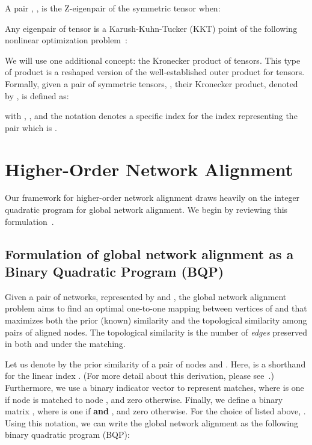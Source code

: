 \documentclass[10pt, journal, compsoc, final]{IEEEtran}
\begin{document}
A pair , , is the Z-eigenpair of
the symmetric tensor  when:

Any eigenpair  of tensor  is a Karush-Kuhn-Tucker (KKT)
point of the following nonlinear optimization problem~\cite{Lim}:


We will use one additional concept: the Kronecker product of tensors. This type of product is a reshaped
version of the well-established outer product for tensors. 
Formally, given a pair of symmetric tensors, , their Kronecker product, denoted by , is defined as:

with , , and the notation  denotes a specific index for the index representing the pair which is . 












\section{Higher-Order Network Alignment}

Our framework for higher-order network alignment draws heavily on the integer quadratic program
for global network alignment. We begin by reviewing this formulation~\cite{BP,Natalie1,Natalie2}.

\subsection{Formulation of global network alignment as a Binary Quadratic Program (BQP)}
\label{sec:GNAnotations}

Given a pair of networks, represented by  and
,
the global network alignment problem aims to find an optimal one-to-one mapping between vertices of
 and  that maximizes both the prior (known) similarity and the topological similarity among pairs of aligned nodes.  The topological similarity is the number of \emph{edges} preserved in both  and  under the matching. 


Let us denote by  the prior similarity of a pair of nodes  and . Here,  is a shorthand for the linear index . (For more detail about this derivation, please see~\cite{BP}.) Furthermore, we use a binary indicator vector  to represent matches, where  is one if node  is matched to node , and zero otherwise. Finally, we define a binary matrix , where  is one if  \textbf{and} , and zero otherwise. For the choice of  listed above, . Using this notation, we can write the global network alignment as the following binary quadratic program (BQP):
\end{document}
